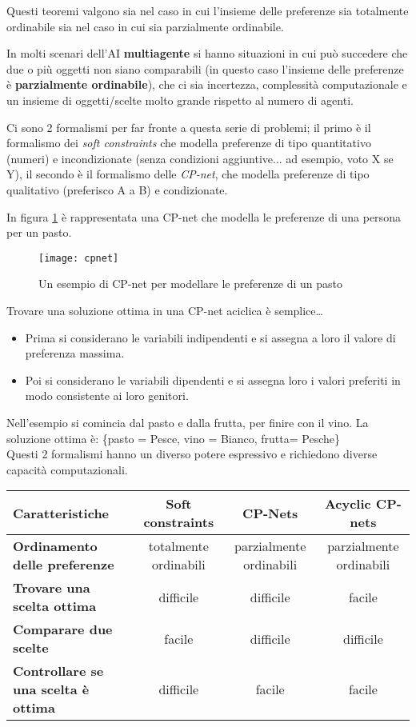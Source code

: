 Questi teoremi valgono sia nel caso in cui l'insieme delle preferenze sia
totalmente ordinabile sia nel caso in cui sia parzialmente ordinabile.

In molti scenari dell'AI \textbf{multiagente} si hanno situazioni in cui
può succedere che due o più oggetti non siano comparabili (in questo caso
l'insieme delle preferenze è \textbf{parzialmente ordinabile}), che ci sia
incertezza, complessità computazionale e un insieme di oggetti/scelte molto
grande rispetto al numero di agenti.

Ci sono 2 formalismi per far fronte a questa serie di problemi; il primo
è il formalismo dei \textit{soft constraints} che modella preferenze di
tipo quantitativo (numeri) e incondizionate (senza condizioni aggiuntive... ad
esempio, voto X se Y), il secondo è il formalismo delle \textit{CP-net}, che
modella preferenze di tipo qualitativo (preferisco A a B) e condizionate.

In figura \ref{fig:cpnet} è rappresentata una CP-net che modella le preferenze
di una persona per un pasto.

\begin{figure}[H]
\centering
\texttt{[image: cpnet]}
\caption{Un esempio di CP-net per modellare le preferenze di un
pasto}
\label{fig:cpnet}
\end{figure}

Trovare una soluzione ottima in una CP-net aciclica è semplice\dots

\begin{itemize}
 \item Prima si considerano le variabili indipendenti e si assegna
a loro il valore di preferenza massima.
 \item Poi si considerano le variabili dipendenti e si assegna loro
i valori preferiti in modo consistente ai loro genitori.
\end{itemize}

Nell'esempio si comincia dal pasto e dalla frutta, per finire con
il vino. La soluzione ottima è: \{pasto = Pesce, vino = Bianco,
frutta= Pesche\}\\

Questi 2 formalismi hanno un diverso potere espressivo e richiedono
diverse capacità computazionali.

\begin{table}[H]
\begin{tabular}{|p{3.5cm}|c|c|c|}
\hline
\textbf{Caratteristiche} & \textbf{Soft constraints} & \textbf{CP-Nets} &
\textbf{Acyclic CP-nets} \\ \hline
\textbf{Ordinamento delle preferenze} & totalmente ordinabili & parzialmente
ordinabili & parzialmente ordinabili \\ \hline
\textbf{Trovare una scelta ottima} & difficile & difficile & facile \\ \hline
\textbf{Comparare due scelte} & facile & difficile & difficile \\ \hline
\textbf{Controllare se una scelta è ottima} & difficile & facile & facile \\
\hline
\end{tabular}
\end{table}
